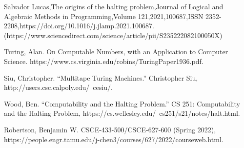 \documentclass[12pt, letterpaper]{article}
\begin{document}
\begin{thebibliography}{book}
 Salvador Lucas,The origins of the halting problem,Journal of Logical and Algebraic Methods in Programming,Volume 121,2021,100687,ISSN 2352-2208,https://doi.org/10.1016/j.jlamp.2021.100687.(https://www.sciencedirect.com/science/article/pii/S235222082100050X)



 Turing, Alan. On Computable Numbers, with an Application to Computer Science. https://www.cs.virginia.edu/robins/TuringPaper1936.pdf. 


 Siu, Christopher. “Multitape Turing Machines.” Christopher Siu, http://users.csc.calpoly.edu/~cesiu/. 

 Wood, Ben. “Computability and the Halting Problem.” CS 251: Computability and the Halting Problem, https://cs.wellesley.edu/~cs251/s21/notes/halt.html. 

 Robertson, Benjamin W. CSCE-433-500/CSCE-627-600 (Spring 2022), https://people.engr.tamu.edu/j-chen3/courses/627/2022/courseweb.html. 

\end{thebibliography}
\end{document}
